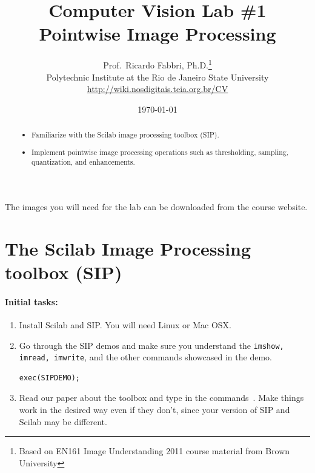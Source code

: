 \documentclass[a4paper]{article}
\begin{document}
\title{\textsf{Computer Vision Lab \#1\\ Pointwise Image Processing}
} 

\author{Prof.\ Ricardo Fabbri, Ph.D.\footnote{Based on EN161 Image Understanding
2011 course material from Brown University}\\[1em]
Polytechnic Institute at the Rio de Janeiro State University\\
\url{http://wiki.nosdigitais.teia.org.br/CV}
}
 

\date{\today}
\maketitle
\begin{abstract}
\noindent\begin{itemize}
\item Familiarize with the Scilab image
processing toolbox (SIP).
\item Implement pointwise image processing operations such as thresholding,
sampling, quantization, and enhancements.
\end{itemize}
\end{abstract}
\vspace{2em}



The images you will need for the lab can be downloaded from the course
website.

\section{The Scilab Image Processing toolbox (SIP)}

\paragraph{Initial tasks:}
\begin{enumerate}
\item Install Scilab and SIP. You will need Linux or Mac OSX.
\item Go through the SIP demos and make sure you understand the \texttt{imshow, imread,
imwrite}, and the other commands showcased in the demo.
\begin{lstlisting}[numbers=none]
exec(SIPDEMO);
\end{lstlisting}
\item Read our paper about the toolbox and type in the commands~\cite{SIP}.
Make things work in the desired way even if they don't, since your version of
SIP and Scilab may be different.
\end{enumerate}
\end{document}
